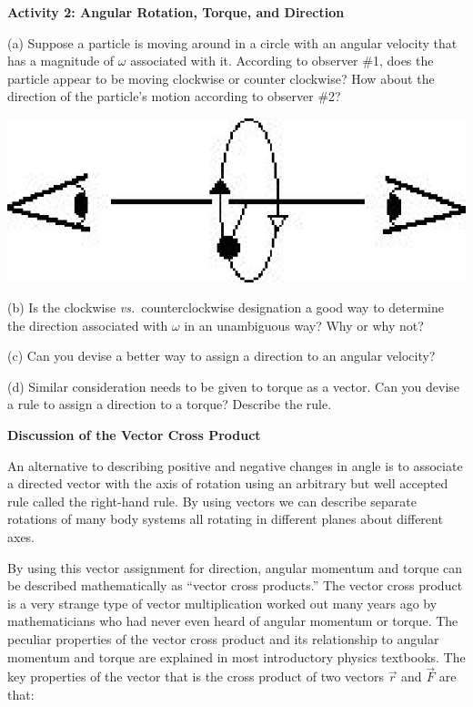 \textbf{Activity 2: Angular Rotation, Torque, and Direction }

(a) Suppose a particle is moving around in a circle with an angular velocity
that has a magnitude of \( \omega  \) associated with it. According to observer
\#1, does the particle appear to be moving clockwise or counter clockwise? How
about the direction of the particle's motion according to observer \#2?

\vspace{0.3cm}
{\par\raggedright \includegraphics{ang_mom/ang_mom_fig2.eps} \par}
\vspace{0.3cm}

(b) Is the clockwise \textit{vs.}~counterclockwise designation a good way to determine
the direction associated with $\omega$ in an unambiguous way? Why or why not? 
\vspace{20mm}

(c) Can you devise a better way to assign a direction to an angular
velocity?
\vspace{20mm}

(d) Similar consideration needs to be given to torque as a vector. Can you devise
a rule to assign a direction to a torque? Describe the rule.
\vspace{20mm}

\textbf{Discussion of the Vector Cross Product }

An alternative to describing positive and negative changes in angle is to associate
a directed vector with the axis of rotation using an arbitrary but
well accepted rule called the right-hand rule. By using vectors we can describe
separate rotations of many body systems all rotating in different planes about
different axes. 

By using this vector assignment for direction, angular momentum and torque can
be described mathematically as ``vector cross products.'' The
vector cross product is a very strange type of vector multiplication worked
out many years ago by mathematicians who had never even heard of angular momentum or torque. The peculiar properties of the vector cross product and its relationship to angular momentum and torque are explained in most introductory physics textbooks.
The key properties of the vector that is the cross product of two vectors \( 
{\vec  r} \)
and \( {\vec  F} \) are that:

